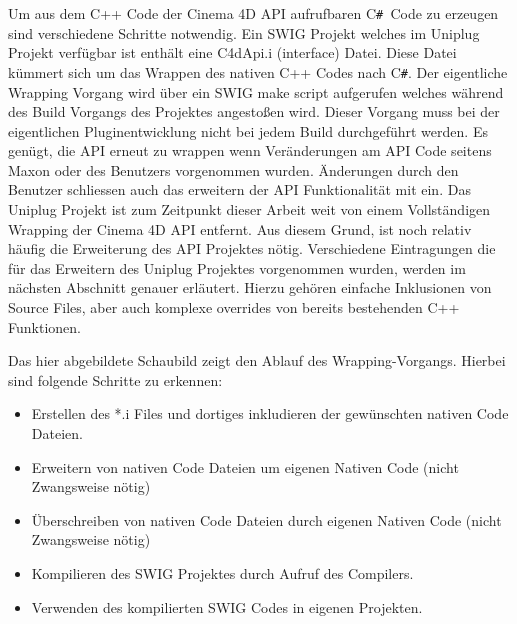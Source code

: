 \documentclass[pagesize, paper=a4, fontsize=12pt,titlepage=true, headings=small, headnosepline, abstractoff, liststotoc, nochapterprefix, plainheadsepline, twoside]{scrreprt}
\newcommand{\CS}{C\texttt{\#}}
\newcommand{\CSS}{C\texttt{\# }}
\begin{document}
Um aus dem C++ Code der Cinema 4D API aufrufbaren \CSS Code zu erzeugen sind verschiedene Schritte notwendig. Ein SWIG Projekt welches im Uniplug Projekt verfügbar ist enthält eine C4dApi.i (interface) Datei. Diese Datei kümmert sich um das Wrappen des nativen C++ Codes nach \CS. Der eigentliche Wrapping Vorgang wird über ein SWIG make script aufgerufen welches während des Build Vorgangs des Projektes angestoßen wird. Dieser Vorgang muss bei der eigentlichen Pluginentwicklung nicht bei jedem Build durchgeführt werden. Es genügt, die API erneut zu wrappen wenn Veränderungen am API Code seitens Maxon oder des Benutzers vorgenommen wurden. Änderungen durch den Benutzer schliessen auch das erweitern der API Funktionalität mit ein. Das Uniplug Projekt ist zum Zeitpunkt dieser Arbeit weit von einem Vollständigen Wrapping der Cinema 4D API entfernt. Aus diesem Grund, ist noch relativ häufig die Erweiterung des API Projektes nötig. Verschiedene Eintragungen die für das Erweitern des Uniplug Projektes vorgenommen wurden, werden im nächsten Abschnitt genauer erläutert. Hierzu gehören einfache Inklusionen von Source Files, aber auch komplexe overrides von bereits bestehenden C++ Funktionen.

Das hier abgebildete Schaubild zeigt den Ablauf des Wrapping-Vorgangs. Hierbei sind folgende Schritte zu erkennen:
\begin{itemize}
\item Erstellen des *.i Files und dortiges inkludieren der gewünschten nativen Code Dateien.
\item Erweitern von nativen Code Dateien um eigenen Nativen Code (nicht Zwangsweise nötig)
\item Überschreiben von nativen Code Dateien durch eigenen Nativen Code (nicht Zwangsweise nötig)
\item Kompilieren des SWIG Projektes durch Aufruf des Compilers.
\item Verwenden des kompilierten SWIG Codes in eigenen Projekten.
\end{itemize}
\end{document}

